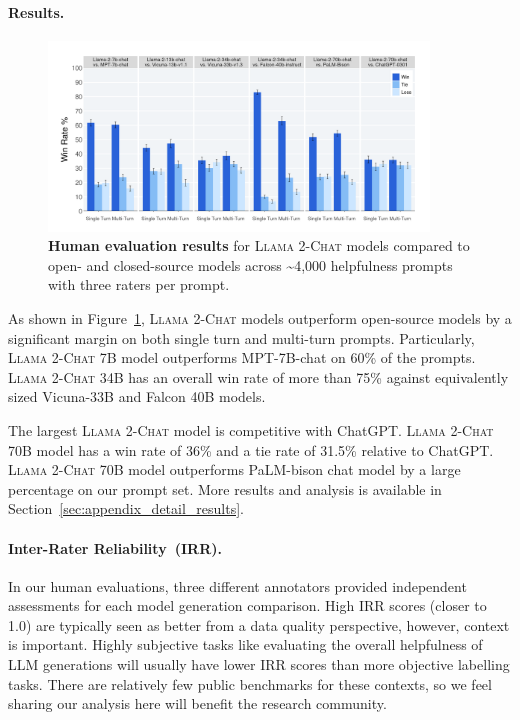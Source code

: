 \documentclass{article}
\newcommand{\modelname}{\textsc{Llama 2-Chat}\xspace}
\begin{document}
\paragraph{Results.}

\begin{figure}
    \centering
    \includegraphics[width=0.9\textwidth]{img/human_evals/single_vs_multiturn.png}
    \caption{\textbf{Human evaluation results} for \modelname models compared to open- and closed-source models across \textasciitilde4,000 helpfulness prompts with three raters per prompt.}
    \label{fig:single_vs_multi_turn}
\end{figure}

As shown in Figure~\ref{fig:single_vs_multi_turn}, \modelname models outperform open-source models by a significant margin on both single turn and multi-turn prompts. Particularly, \modelname 7B model outperforms MPT-7B-chat on 60\% of the prompts. \modelname 34B has an overall win rate of more than 75\% against equivalently sized Vicuna-33B and Falcon 40B models. 

The largest \modelname model is competitive with ChatGPT. \modelname 70B model has a win rate of 36\% and a tie rate of 31.5\% relative to ChatGPT. \modelname 70B model outperforms PaLM-bison chat model by a large percentage on our prompt set. More results and analysis is available in Section~\ref{sec:appendix_detail_results}.

\paragraph{Inter-Rater Reliability~(IRR).}
In our human evaluations, three different annotators provided independent assessments for each model generation comparison. High IRR scores (closer to 1.0) are typically seen as better from a data quality perspective, however, context is important. Highly subjective tasks like evaluating the overall helpfulness of LLM generations will usually have lower IRR scores than more objective labelling tasks. There are relatively few public benchmarks for these contexts, so we feel sharing our analysis here will benefit the research community.
\end{document}
